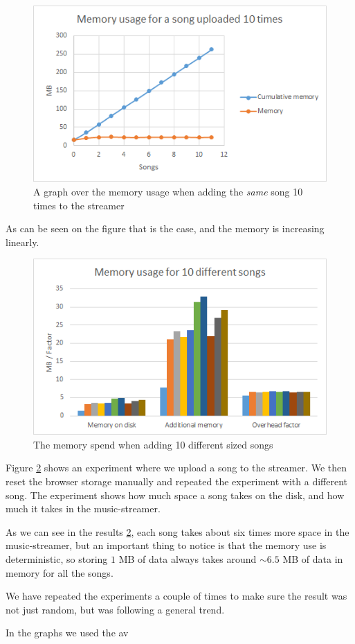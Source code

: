 \begin{figure}[H]
	\centering
	\includegraphics[scale=0.9]{gfx/memoryUsage}
    \caption{A graph over the memory usage when adding the {\em same} song 10 times to the streamer}
	\label{fig:memoryUsage}
\end{figure}
\noindent
As can be seen on the figure that is the case, and the memory is increasing linearly.

\begin{figure}[H]
	\centering
	\includegraphics[scale=0.9]{gfx/memoryDiffSize}
	\caption{The memory spend when adding 10 different sized songs}
	\label{fig:memoryDiffSizes}
\end{figure}
\noindent
Figure \ref{fig:memoryDiffSizes} shows an experiment where we upload a song to the streamer. 
We then reset the browser storage manually and repeated the experiment with a different song.
The experiment shows how much space a song takes on the disk,
and how much it takes in the music-streamer.

As we can see in the results \ref{fig:memoryDiffSizes},
each song takes about six times more space in the music-streamer, 
but an important thing to notice is that the memory use is deterministic,
so storing $1$ MB of data always takes around $\sim6.5$ MB of data in memory for all the songs.

We have repeated the experiments a couple of times to make sure the result was not just random, 
but was following a general trend. 

In the graphs we used the av
